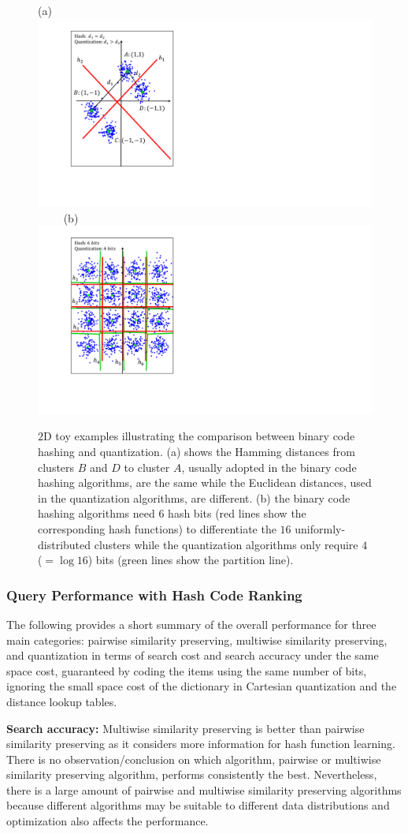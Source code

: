 \documentclass[10pt,journal,compsoc]{IEEEtran}
\begin{document}
\begin{figure}[t]
\centering
\small{(a)}~{\includegraphics[width=.4\linewidth, clip]{figs/nonUniformClusters}}~~~~
\small{(b)}~{\includegraphics[width=.4\linewidth, clip]{figs/uniformClusters}}
\caption{$2$D toy examples illustrating the comparison
between binary code hashing and quantization.
(a) shows the Hamming distances from clusters $B$ and $D$ to cluster $A$,
usually adopted in the binary code hashing algorithms,
are the same
while the Euclidean distances,
used in the quantization algorithms,
are different.
(b) the binary code hashing algorithms need $6$ hash bits (red lines show the corresponding hash functions)
to
differentiate the $16$ uniformly-distributed clusters
while the quantization algorithms only require $4$ ($= \log 16 $) bits
(green lines show the partition line).
}
\label{fig:QuantizationOverHash}
\vspace{-.5cm}
\end{figure}

\subsubsection{Query Performance with Hash Code Ranking}
\label{sec:discussion:queryperformance:HCR}
The following provides a short summary
of the overall performance
for three main categories:
pairwise similarity preserving,
multiwise similarity preserving,
and quantization
in terms of search cost and search accuracy
under the same space cost,
guaranteed by coding the items
using the same number of bits,
ignoring the small space cost of the dictionary
in Cartesian quantization
and the distance lookup tables.

\textbf{Search accuracy:}
Multiwise similarity preserving is better
than pairwise similarity preserving
as it considers more information
for hash function learning.
There is no observation/conclusion
on
which algorithm, pairwise or multiwise similarity preserving algorithm,
performs consistently the best.
Nevertheless, there is a large amount of pairwise and multiwise similarity preserving algorithms
because different algorithms may be suitable to different data distributions
and optimization also affects the performance.
\end{document}
